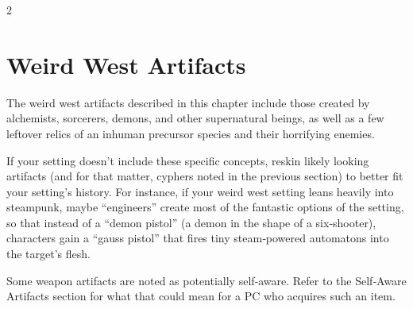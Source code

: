 \begin{multicols}{2}

\section{Weird West Artifacts}

The weird west artifacts described in this chapter include those created by alchemists, sorcerers, demons, and other supernatural beings, as well as a few leftover relics of an inhuman precursor species and their horrifying enemies. 

If your setting doesn’t include these specific concepts, reskin likely looking artifacts (and for that matter, cyphers noted in the previous section) to better fit your setting’s history. For instance, if your weird west setting leans heavily into steampunk, maybe “engineers” create most of the fantastic options of the setting, so that instead of a “demon pistol” (a demon in the shape of a six‑shooter), characters gain a “gauss pistol” that fires tiny steam‑powered automatons into the target’s flesh. 

Some weapon artifacts are noted as potentially self‑aware. Refer to the Self‑Aware Artifacts section for what that could mean for a PC who acquires such an item.

\end{multicols}


